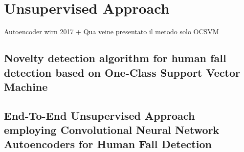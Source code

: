 \chapter{Unsupervised Approach}
Autoencoder wirn 2017 +
Qua veine presentato  il metodo solo OCSVM 
\section{Novelty detection algorithm for human fall detection based on One-Class Support Vector Machine}
\label{sec:ocsvm}
\section{End-To-End Unsupervised Approach employing Convolutional Neural Network
Autoencoders for Human Fall Detection}
\label{sec:autoencoder}
